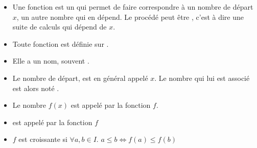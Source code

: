 \begin{mydefs}
	\begin{itemize}
		\item Une fonction est un  qui permet de faire correspondre à un nombre de départ $x$, un autre nombre qui en dépend. Le procédé peut être , c'est à dire une suite de calculs qui dépend de $x$.
		
		\item Toute fonction est définie sur .
		
		\item Elle a un nom, souvent .
		
		\item Le nombre de départ,  est en général appelé $x$. Le nombre qui lui est associé est alors noté .
		
		\item Le nombre $f(x)$ est appelé  par la fonction $f$.
		
		\item {} est appelé  par la fonction $f$
		
		\item $f$ est croissante si $ \forall a, b \in I.$ $ a \leq b \Leftrightarrow f(a) \leq f(b) $ 
	\end{itemize}
\end{mydefs}